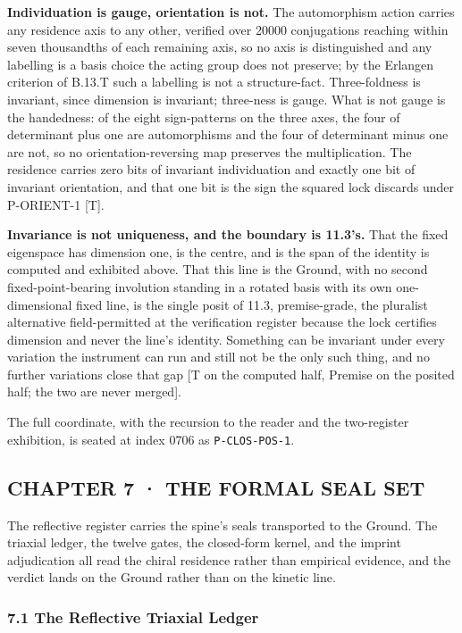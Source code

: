\documentclass[10pt,twocolumn]{article}
\begin{document}
\textbf{Individuation is gauge, orientation is not.} The automorphism
action carries any residence axis to any other, verified over 20000
conjugations reaching within seven thousandths of each remaining axis,
so no axis is distinguished and any labelling is a basis choice the
acting group does not preserve; by the Erlangen criterion of B.13.T such
a labelling is not a structure-fact. Three-foldness is invariant, since
dimension is invariant; three-ness is gauge. What is not gauge is the
handedness: of the eight sign-patterns on the three axes, the four of
determinant plus one are automorphisms and the four of determinant minus
one are not, so no orientation-reversing map preserves the
multiplication. The residence carries zero bits of invariant
individuation and exactly one bit of invariant orientation, and that one
bit is the sign the squared lock discards under P-ORIENT-1 {[}T{]}.

\textbf{Invariance is not uniqueness, and the boundary is 11.3's.} That
the fixed eigenspace has dimension one, is the centre, and is the span
of the identity is computed and exhibited above. That this line is the
Ground, with no second fixed-point-bearing involution standing in a
rotated basis with its own one-dimensional fixed line, is the single
posit of 11.3, premise-grade, the pluralist alternative field-permitted
at the verification register because the lock certifies dimension and
never the line's identity. Something can be invariant under every
variation the instrument can run and still not be the only such thing,
and no further variations close that gap {[}T on the computed half,
Premise on the posited half; the two are never merged{]}.

The full coordinate, with the recursion to the reader and the
two-register exhibition, is seated at index 0706 as
\texttt{P-CLOS-POS-1}.

\hypertarget{chapter-7-the-formal-seal-set}{%
\subsection{CHAPTER 7 · THE FORMAL SEAL
SET}\label{chapter-7-the-formal-seal-set}}

The reflective register carries the spine's seals transported to the
Ground. The triaxial ledger, the twelve gates, the closed-form kernel,
and the imprint adjudication all read the chiral residence rather than
empirical evidence, and the verdict lands on the Ground rather than on
the kinetic line.

\hypertarget{the-reflective-triaxial-ledger}{%
\subsubsection{7.1 The Reflective Triaxial
Ledger}\label{the-reflective-triaxial-ledger}}
\end{document}
